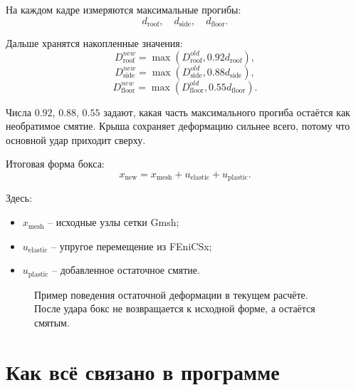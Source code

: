 \documentclass[12pt,a4paper]{article}
\begin{document}
На каждом кадре измеряются максимальные прогибы:
\[
d_{\text{roof}}, \quad d_{\text{side}}, \quad d_{\text{floor}}.
\]

Дальше хранятся накопленные значения:
\[
D_{\text{roof}}^{new}
=
\max(D_{\text{roof}}^{old}, 0.92d_{\text{roof}}),
\]
\[
D_{\text{side}}^{new}
=
\max(D_{\text{side}}^{old}, 0.88d_{\text{side}}),
\]
\[
D_{\text{floor}}^{new}
=
\max(D_{\text{floor}}^{old}, 0.55d_{\text{floor}}).
\]

Числа \(0.92\), \(0.88\), \(0.55\) задают, какая часть максимального прогиба
остаётся как необратимое смятие. Крыша сохраняет деформацию сильнее всего,
потому что основной удар приходит сверху.

Итоговая форма бокса:
\[
x_{\text{new}}
=
x_{\text{mesh}}
+
u_{\text{elastic}}
+
u_{\text{plastic}}.
\]

Здесь:

\begin{itemize}
  \item \(x_{\text{mesh}}\) -- исходные узлы сетки Gmsh;
  \item \(u_{\text{elastic}}\) -- упругое перемещение из FEniCSx;
  \item \(u_{\text{plastic}}\) -- добавленное остаточное смятие.
\end{itemize}

\begin{figure}[h]
\centering
{}
\caption{Пример поведения остаточной деформации в текущем расчёте. После удара
бокс не возвращается к исходной форме, а остаётся смятым.}
\end{figure}

\section{Как всё связано в программе}
\end{document}
